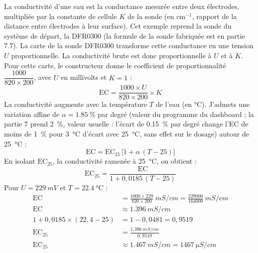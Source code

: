 \begin{demonstration}
La conductivité d'une eau est la conductance mesurée entre deux électrodes, multipliée par la constante de cellule $K$ de la sonde (en cm$^{-1}$, rapport de la distance entre électrodes à leur surface). Cet exemple reprend la sonde du système de départ, la DFR0300 (la formule de la sonde fabriquée est en partie 7.7). La carte de la sonde DFR0300 transforme cette conductance en une tension $U$ proportionnelle. La conductivité brute est donc proportionnelle à $U$ et à $K$. Pour cette carte, le constructeur donne le coefficient de proportionnalité $\dfrac{1000}{820 \times 200}$, avec $U$ en millivolts et $K = 1$ :
\[
\mathrm{EC} = \frac{1000 \times U}{820 \times 200}\times K
\]
La conductivité augmente avec la température $T$ de l'eau (en \unit{\celsius}). J'admets une variation affine de $\alpha = \qty{1,85}{\percent}$ par degré (valeur du programme du dashboard ; la partie 7 prend \qty{2}{\percent}, valeur usuelle : l'écart de \qty{0,15}{\percent} par degré change l'EC de moins de \qty{1}{\percent} pour \qty{3}{\celsius} d'écart avec \qty{25}{\celsius}, sans effet sur le dosage) autour de \qty{25}{\celsius} :
\[
\mathrm{EC} = \mathrm{EC}_{25}\,\bigl[1 + \alpha\,(T - 25)\bigr]
\]
En isolant $\mathrm{EC}_{25}$, la conductivité ramenée à \qty{25}{\celsius}, on obtient :
\[
\mathrm{EC}_{25} = \frac{\mathrm{EC}}{1 + 0{,}0185\,(T - 25)}
\]
Pour $U = \qty{229}{mV}$ et $T = \qty{22,4}{\celsius}$ :
\begin{align*}
\mathrm{EC} &= \frac{1000 \times 229}{820 \times 200}\ \unit{mS/cm} = \frac{229000}{164000}\ \unit{mS/cm}\\
\mathrm{EC} &\approx \qty{1,396}{mS/cm}\\
1 + 0{,}0185 \times (22{,}4 - 25) &= 1 - 0{,}0481 = 0{,}9519\\
\mathrm{EC}_{25} &= \frac{\qty{1,396}{mS/cm}}{0{,}9519}\\
\mathrm{EC}_{25} &\approx \qty{1,467}{mS/cm} = \qty{1467}{\micro S/cm}
\end{align*}
\end{demonstration}

